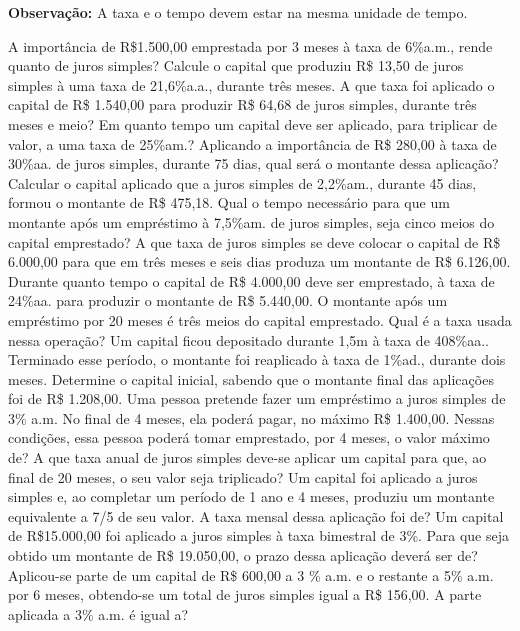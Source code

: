 \textbf{Observação:} A taxa e o tempo devem estar na mesma unidade de tempo.


\begin{exercicios}

    \exitem{} A importância de R\$1.500,00 emprestada por 3 meses à taxa de 6\%a.m., rende quanto de juros simples?
    \exitem{} Calcule o capital que produziu R\$ 13,50 de juros simples à uma taxa de 21,6\%a.a., durante três meses.
    \exitem{} A que taxa foi aplicado o capital de R\$ 1.540,00 para produzir R\$ 64,68 de juros simples, durante três meses e meio?
    \exitem{} Em quanto tempo um capital deve ser aplicado, para triplicar de valor, a uma taxa de 25\%am.?
    \exitem{} Aplicando a importância de R\$ 280,00 à taxa de 30\%aa. de juros simples, durante 75 dias, qual será o montante dessa aplicação?       				
    \exitem{} Calcular o capital aplicado que a juros simples de 2,2\%am., durante 45 dias, formou o montante de R\$ 475,18.        
    \exitem{} Qual o tempo necessário para que um montante após um empréstimo à 7,5\%am. de juros simples, seja cinco meios do capital emprestado?    			
    \exitem{} A que taxa de juros simples se deve colocar o capital de R\$ 6.000,00 para que em três meses e seis dias produza um montante de R\$ 6.126,00.    
    \exitem{} Durante quanto tempo o capital de R\$ 4.000,00 deve ser emprestado, à taxa de 24\%aa. para produzir o montante de R\$ 5.440,00.					
    \exitem{} O montante após um empréstimo por 20 meses é três meios do capital emprestado. Qual é a taxa usada nessa operação?  
    \exitem{} Um capital ficou depositado durante 1,5m à taxa de 408\%aa.. Terminado esse período, o montante foi reaplicado à taxa de 1\%ad., durante dois meses. Determine o capital inicial, sabendo que o montante final das aplicações foi de R\$ 1.208,00. 	
    \exitem{} Uma pessoa pretende fazer um empréstimo a juros simples de 3\% a.m. No final de 4 meses, ela poderá pagar, no máximo R\$ 1.400,00. Nessas condições, essa pessoa poderá tomar emprestado, por 4 meses, o valor máximo de?				
    \exitem{} A que taxa anual de juros simples deve-se aplicar um capital para que, ao final de 20 meses, o seu valor seja triplicado? 
    \exitem{} Um capital foi aplicado a juros simples e, ao completar um período de 1 ano e 4 meses, produziu um montante equivalente a 7/5 de seu valor. A taxa mensal dessa aplicação foi de? 
    \exitem{} Um  capital de R\$15.000,00 foi aplicado a juros simples à taxa bimestral de 3\%. Para que seja obtido um montante de R\$ 19.050,00, o prazo dessa aplicação deverá ser de?    
    \exitem{} Aplicou-se parte de um capital de R\$ 600,00 a 3 \% a.m. e o restante a 5\% a.m. por 6 meses, obtendo-se um total de juros simples igual a R\$ 156,00. A parte aplicada a 3\% a.m. é igual a? 


\end{exercicios}
